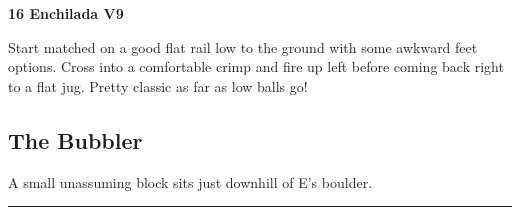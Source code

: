 \begin{multicols}{2}
					\begin{minipage}{\linewidth}	
					\label{rt:Enchilada}\colorbox{Goldenrod!50}{\textbf{16 Enchilada V9 \ding{72}   }}
					\begin{adjustwidth}{0.5cm}{}				
					Start matched on a good flat rail low to the ground with some awkward feet options. Cross into a comfortable crimp and fire up left before coming back right to a flat jug. Pretty classic as far as low balls go!
					\end{adjustwidth}
					\end{minipage}
			\subsection*{The Bubbler}\label{bf:The Bubbler}
			\begin{minipage}{\columnwidth}
			A small unassuming block sits just downhill of E's boulder.
			\end{minipage}
			
\end{multicols}
\rule{\textwidth}{1pt}
